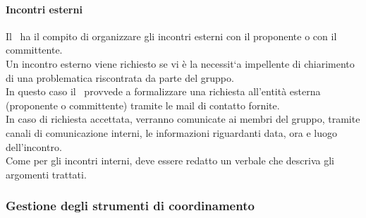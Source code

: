       \paragraph{Incontri esterni}
        Il \roleProjectManager\ ha il compito di organizzare gli incontri esterni con il proponente o con il committente.\\
        Un incontro esterno viene richiesto se vi è la necessit`a impellente di chiarimento di una problematica riscontrata da parte del gruppo.\\
        In questo caso il \roleProjectManager\ provvede a formalizzare una richiesta all’entità esterna (proponente o committente) tramite le mail di contatto fornite.\\
        In caso di richiesta accettata, verranno comunicate ai membri del gruppo, tramite canali di comunicazione interni, le informazioni riguardanti data, ora e luogo dell’incontro.\\
        Come per gli incontri interni, deve essere redatto un verbale che descriva gli argomenti trattati.

    \subsubsection{Gestione degli strumenti di coordinamento}
